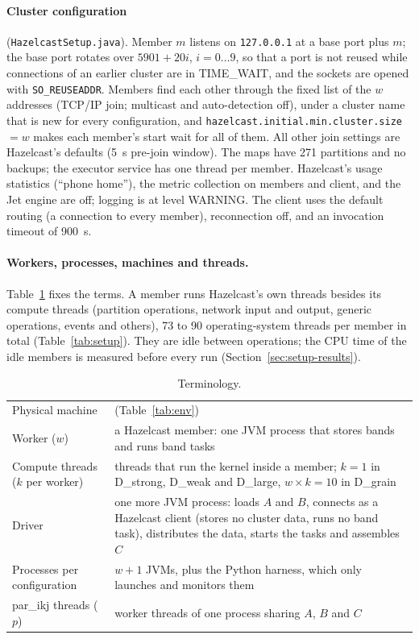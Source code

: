 \documentclass[11pt,a4paper]{article}
\begin{document}
\paragraph{Cluster configuration} (\texttt{HazelcastSetup.java}). Member $m$
listens on \texttt{127.0.0.1} at a base port plus $m$; the base port rotates
over $5901+20i$, $i=0\ldots9$, so that a port is not reused while connections of
an earlier cluster are in TIME\_WAIT, and the sockets are opened with
\texttt{SO\_REUSEADDR}. Members find each other through the fixed list of the
$w$ addresses (TCP/IP join; multicast and auto-detection off), under a cluster
name that is new for every configuration, and
\texttt{hazelcast.initial.min.cluster.size} $=w$ makes each member's start wait
for all of them. All other join settings are Hazelcast's defaults (5~s pre-join
window). The maps have 271 partitions and no backups; the executor service has
one thread per member. Hazelcast's usage statistics (``phone home''), the
metric collection on members and client, and the Jet engine are off; logging is
at level WARNING. The client uses the default routing (a connection to every
member), reconnection off, and an invocation timeout of 900~s.

\paragraph{Workers, processes, machines and threads.} Table~\ref{tab:terms}
fixes the terms. A member runs Hazelcast's own threads besides its compute
threads (partition operations, network input and output, generic operations,
events and others), 73 to 90 operating-system threads per member in total
(Table~\ref{tab:setup}). They are idle between operations; the CPU time of
the idle members is measured before every run (Section~\ref{sec:setup-results}).

\begin{table}[htbp]
\centering\small
\caption{Terminology.}
\label{tab:terms}
\begin{tabular}{>{\raggedright}p{3.4cm}>{\raggedright\arraybackslash}p{11.0cm}}
\toprule
Physical machine & 1 (Table~\ref{tab:env}) \\
Worker ($w$) & a Hazelcast member: one JVM process that stores bands and runs
band tasks \\
Compute threads ($k$ per worker) & threads that run the kernel inside a member;
$k=1$ in D\_strong, D\_weak and D\_large, $w\times k=10$ in D\_grain \\
Driver & one more JVM process: loads $A$ and $B$, connects as a Hazelcast client
(stores no cluster data, runs no band task), distributes the data, starts the
tasks and assembles $C$ \\
Processes per configuration & $w+1$ JVMs, plus the Python harness, which only
launches and monitors them \\
par\_ikj threads ($p$) & worker threads of one process sharing $A$, $B$ and $C$ \\
\bottomrule
\end{tabular}
\end{table}
\end{document}
